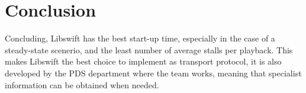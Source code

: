 \section{Conclusion}
Concluding, Libswift has the best start-up time, especially in the case of a steady-state scenerio, and the least number of average stalls per playback. This makes Libswift the best choice to implement as transport protocol, it is also developed by the PDS department where the team works, meaning that specialist information can be obtained when needed.